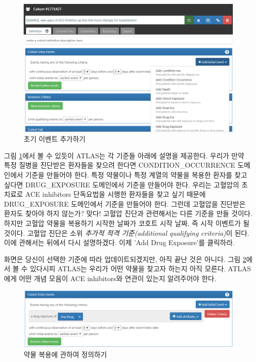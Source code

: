 \documentclass[11pt]{book}
\theoremstyle{definition}
\theoremstyle{definition}
\theoremstyle{definition}
\theoremstyle{remark}
\begin{document}
\begin{figure}

{\centering \includegraphics[width=1\linewidth]{images/Cohorts/ATLAS-initialevent} 

}

\caption{초기 이벤트 추가하기}\label{fig:ATLASinitialevent}
\end{figure}

그림 \ref{fig:ATLASinitialevent}에서 볼 수 있듯이 ATLAS는 각 기준들
아래에 설명을 제공한다. 우리가 만약 특정 질병을 진단받은 환자들을 찾으려
한다면 CONDITION\_OCCURRENCE 도메인에서 기준을 만들어야 한다. 특정
약물이나 특정 계열의 약물을 복용한 환자를 찾고 싶다면 DRUG\_EXPOSURE
도메인에서 기준을 만들어야 한다. 우리는 고혈압의 초치료로 ACE inhibitors
단독요법을 시행한 환자들을 찾고 싶기 때문에 DRUG\_EXPOSURE 도메인에서
기준을 만들어야 한다. 그런데 고혈압을 진단받은 환자도 찾아야 하지
않는가? 맞다! 고혈압 진단과 관련해서는 다른 기준을 만들 것이다. 하지만
고혈압 약물을 복용하기 시작한 날짜가 코호트 시작 날짜, 즉 시작 이벤트가
될 것이다. 고혈압 진단은 소위 \emph{추가적 적격 기준(additional
qualifying criteria)}이 된다. 이에 관해서는 뒤에서 다시 설명하겠다. 이제
'Add Drug Exposure'를 클릭하라.

화면은 당신이 선택한 기준에 따라 업데이트되겠지만, 아직 끝난 것은
아니다. 그림 \ref{fig:ATLASdrugexposure}에서 볼 수 있다시피 ATLAS는
우리가 어떤 약물을 찾고자 하는지 아직 모른다. ATLAS에게 어떤 개념 모음이
ACE inhibitors와 연관이 있는지 알려주어야 한다.

\begin{figure}

{\centering \includegraphics[width=1\linewidth]{images/Cohorts/ATLAS-drugexposure} 

}

\caption{약물 복용에 관하여 정의하기}\label{fig:ATLASdrugexposure}
\end{figure}
\end{document}
